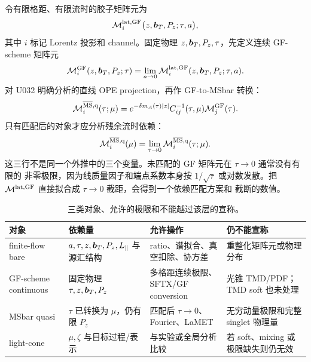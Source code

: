 令有限格距、有限流时的胶子矩阵元为
\begin{equation}
  \mathcal M^{\rm lat,GF}_{i}
  \bigl(z,\boldsymbol b_T,P_z;\tau,a\bigr),
  \label{eq:b06-lattice-matrix-element}
\end{equation}
其中 \(i\) 标记 Lorentz 投影和 channel。固定物理 \(z,\boldsymbol b_T,P_z,\tau\)，先定义连续
GF-scheme 矩阵元
\begin{equation}
  \mathcal M^{\rm GF}_{i}(z,\boldsymbol b_T,P_z;\tau)
  =\lim_{a\to0}\mathcal M^{\rm lat,GF}_{i}(z,\boldsymbol b_T,P_z;\tau,a).
  \label{eq:b06-fixed-tau-continuum}
\end{equation}
对 U032 明确分析的直线 OPE projection，再作 GF-to-MSbar 转换：
\begin{equation}
  \mathcal M^{\overline{\mathrm{MS}},{\rm q}}_{i}(\tau;\mu)
  =e^{-\delta m_A(\tau)|z|}
  C^{-1}_{ij}(\tau,\mu)\mathcal M^{\rm GF}_{j}(\tau).
  \label{eq:b06-gf-to-quasi}
\end{equation}
只有匹配后的对象才应分析残余流时依赖：
\begin{equation}
  \mathcal M^{\overline{\mathrm{MS}},{\rm q}}_{i}(\mu)
  =\lim_{\tau\to0}\mathcal M^{\overline{\mathrm{MS}},{\rm q}}_{i}(\tau;\mu).
  \label{eq:b06-matched-flow-limit}
\end{equation}
这三行不是同一个外推中的三个变量。未匹配的 GF 矩阵元在 \(\tau\to0\) 通常没有有限的
非零极限，因为线质量因子和端点系数本身按 \(1/\sqrt\tau\) 或对数发散。把
\(\mathcal M^{\rm lat,GF}\) 直接拟合成 \(\tau\to0\) 截距，会得到一个依赖匹配方案和
截断的数值。

\begin{table}[htbp]
\centering
\caption{三类对象、允许的极限和不能越过该层的宣称。}
\label{tab:b06-object-levels}
\small
\begin{tabularx}{\textwidth}{@{}p{}p{}p{}X@{}}
\toprule
对象 & 依赖量 & 允许操作 & 仍不能宣称 \\
\midrule
finite-flow bare & \(a,\tau,z,\boldsymbol b_T,P_z,L_\parallel\) 与源汇结构 & ratio、谱拟合、真空扣除、协方差 & 重整化矩阵元或物理分布 \\
GF-scheme continuous & 固定物理 \(\tau,z,\boldsymbol b_T,P_z\) & 多格距连续极限、SFTX/GF conversion & 光锥 TMD/PDF；TMD soft 也未处理 \\
MSbar quasi & \(\tau\) 已转换为 \(\mu\)，仍有限 \(P_z\) & 匹配后 \(\tau\to0\)、Fourier、LaMET & 无穷动量极限和完整 singlet 物理量 \\
light-cone & \(\mu,\zeta\) 与目标过程/表示 & 与实验或全局分析比较 & 若 soft、mixing 或极限缺失则仍无效 \\
\bottomrule
\end{tabularx}
\end{table}

